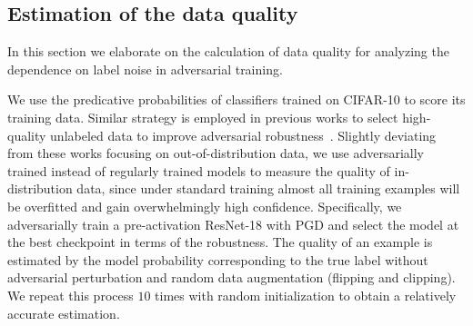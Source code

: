 \subsection{Estimation of the data quality}
In this section we elaborate on the calculation of data quality for analyzing the dependence on label noise in adversarial training.

We use the predicative probabilities of classifiers trained on CIFAR-10 to score its training data. Similar strategy is employed in previous works to select high-quality unlabeled data to improve adversarial robustness~\citep{Uesato2019AreLR, Carmon2019UnlabeledDI, Gowal2020UncoveringTL}. Slightly deviating from these works focusing on out-of-distribution data, we use adversarially trained instead of regularly trained models to measure the quality of in-distribution data, since under standard training almost all training examples will be overfitted and gain overwhelmingly high confidence. Specifically, we adversarially train a pre-activation ResNet-18 with PGD and select the model at the best checkpoint in terms of the robustness. The quality of an example is estimated by the model probability corresponding to the true label without adversarial perturbation and random data augmentation (flipping and clipping). We repeat this process $10$ times with random initialization to obtain a relatively accurate estimation.
